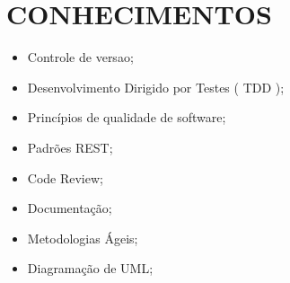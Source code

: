 
  \section{CONHECIMENTOS}
  \begin{itemize}
    \item Controle de versao;
    \item Desenvolvimento Dirigido por Testes ( TDD );
    \item Princípios de qualidade de software;
    \item Padrões REST;
    \item Code Review;
    \item Documentação;
    \item Metodologias Ágeis;
    \item Diagramação de UML;
  \end{itemize}
